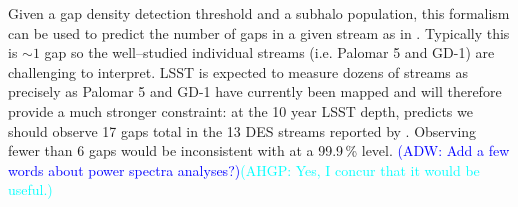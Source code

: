 \documentclass[modern,linenumbers]{aastex62}
\newcommand{\Comment}[3]{\textcolor{#1}{(#2: #3)}}
\newcommand{\ADW}[1]{\Comment{blue}{ADW}{#1}} %
\newcommand{\EON}[1]{\Comment{purple}{EON}{#1}} %
\newcommand{\DAH}[1]{\Comment{blue}{DH}{#1}} %
\newcommand{\AHGP}[1]{\Comment{cyan}{AHGP}{#1}} %
\begin{document}
Given a gap density detection threshold and a subhalo population, this formalism can be used to predict the number of gaps in a given stream as in \citet{erkal2016}. Typically this is $\sim 1$ gap  so the well--studied individual streams (i.e. Palomar 5 and GD-1) are challenging to interpret. LSST is expected to measure dozens of streams as precisely as Palomar 5 and GD-1 have currently been mapped and will therefore provide a much stronger constraint: at the 10 year LSST depth, \LCDM predicts we should observe 17 gaps total in the 13 DES streams reported by \cite{2018ApJ...862..114S}. Observing fewer than 6 gaps would be inconsistent with \LCDM at a 99.9\,\% level. \ADW{Add a few words about power spectra analyses?}\AHGP{Yes, I concur that it would be useful.}




\end{document}
